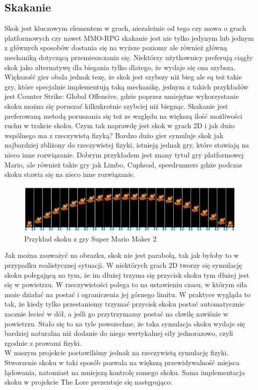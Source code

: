 \documentclass[oneside,polski,logo]{amuthesis}
\begin{document}
\subsection{Skakanie} 
Skok jest kluczowym elementem w grach, niezależnie od tego czy mowa o grach platformowych czy nawet MMO-RPG skakanie jest nie tylko jedynym lub jednym z głównych sposobów dostania się na wyższe poziomy ale również główną mechaniką dotyczącą przemieszczania się. Niektórzy użytkownicy preferują ciągły skok jako alternatywę dla biegania tylko dlatego, że wydaje się ona szybsza. Większość gier obala jednak tezę, że skok jest szybszy niż bieg ale są też takie gry, które specjalnie implementują taką mechanikę, jednym z takich przykładów jest Counter Strike: Global Offensive, gdzie poprzez umiejętne wykorzystanie skoku można się poruszać kilkukrotnie szybciej niż biegnąc. Skakanie jest preferowaną metodą poruszania się też ze względu na większą ilość możliwości ruchu w trakcie skoku.
Czym tak naprawdę jest skok w grach 2D i jak dużo wspólnego ma z rzeczywistą fizyką? Bardzo dużo gier symuluje skok jak najbardziej zbliżony do rzeczywistej fizyki, istnieją jednak gry, które stawiają na nieco inne rozwiązanie. Dobrym przykładem jest znany tytuł gry platformowej Mario, ale również takie gry jak Limbo, Cuphead, speedrunners gdzie podczas skoku stawia się na nieco inne rozwiązanie. \cite{jumping1} 
\begin{figure}[h]
	\centering
	\includegraphics[width=13cm]{images/kozubal/mario.jpg}
	\caption{Przykład skoku z gry Super Mario Maker 2 \cite{jumping3}}
\end{figure}

\newpage
Jak można zauważyć na obrazku, skok nie jest parabolą, tak jak byłoby to w przypadku realistycznej sytuacji. W niektórych grach 2D tworzy się symulację skoku polegającą na tym, że im dłużej trzyma się przycisk skoku tym dłużej jest się w powietrzu. W rzeczywistości polega to na ustawieniu czasu, w którym siła może działać na postać i ograniczenia jej górnego limitu. W praktyce wygląda to tak, że kiedy tylko przestaniemy trzymać przycisk skoku postać automatycznie zacznie lecieć w dół, a jeśli go przytrzymamy postać na chwilę zawiśnie w powietrzu. Stało się to na tyle powszechne, że taka symulacja skoku wydaje się bardziej naturalna niż dodanie do niego wertykalnej siły jednorazowo, czyli zgodnie z prawami fizyki. \cite{jumping2} \\ W naszym projekcie postawiliśmy jednak na rzeczywistą symulację fizyki. Stworzenie skoku w taki sposób pozwala na większą przewidywalność miejsca lądowania, natomiast na mniejszą kontrolę samego skoku. Sama implementacja skoku w projekcie The Lore prezentuje się następująco:
\end{document}
